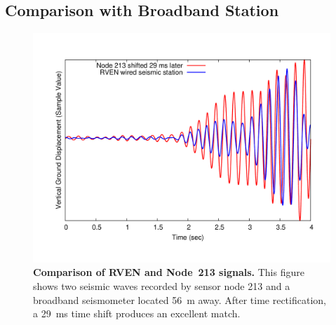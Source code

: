 \subsection{Comparison with Broadband Station}
\label{evaluation-sec-datagroundtruthing}

\begin{figure}[t]
\begin{center}
\includegraphics[width=\hsize]{./3-evaluation/figs/broadbandmatch.pdf}
\end{center}

\caption{\textbf{Comparison of RVEN and Node~213 signals.} This figure shows
two seismic waves recorded by sensor node 213 and a broadband seismometer
located 56~m away. After time rectification, a 29~ms time shift produces an
excellent match.}

\label{evaluation-fig-broadbandmatch}
\end{figure}

